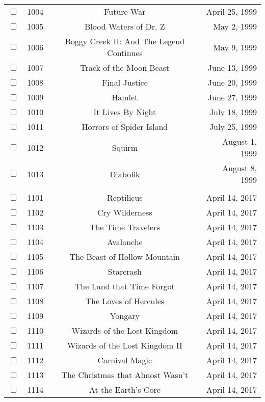 \documentclass[12pt]{article}
\begin{document}
\begin{center}
\begin{longtable}[c]{cccr}
$\Box$&1004&Future War&April 25, 1999\\
$\Box$&1005&Blood Waters of Dr. Z&May  2, 1999\\
$\Box$&1006&Boggy Creek II: And The Legend Continues&May  9, 1999\\
$\Box$&1007&Track of the Moon Beast&June 13, 1999\\
$\Box$&1008&Final Justice&June 20, 1999\\
$\Box$&1009&Hamlet&June 27, 1999\\
$\Box$&1010&It Lives By Night&July 18, 1999\\
$\Box$&1011&Horrors of Spider Island&July 25, 1999\\
$\Box$&1012&Squirm&August  1, 1999\\
$\Box$&1013&Diabolik&August  8, 1999\\
\\
$\Box$&1101&Reptilicus&April 14, 2017\\
$\Box$&1102&Cry Wilderness&April 14, 2017\\
$\Box$&1103&The Time Travelers&April 14, 2017\\
$\Box$&1104&Avalanche&April 14, 2017\\
$\Box$&1105&The Beast of Hollow Mountain&April 14, 2017\\
$\Box$&1106&Starcrash&April 14, 2017\\
$\Box$&1107&The Land that Time Forgot&April 14, 2017\\
$\Box$&1108&The Loves of Hercules&April 14, 2017\\
$\Box$&1109&Yongary&April 14, 2017\\
$\Box$&1110&Wizards of the Lost Kingdom&April 14, 2017\\
$\Box$&1111&Wizards of the Lost Kingdom II&April 14, 2017\\
$\Box$&1112&Carnival Magic&April 14, 2017\\
$\Box$&1113&The Christmas that Almost Wasn't&April 14, 2017\\
$\Box$&1114&At the Earth's Core&April 14, 2017\\

\end{longtable}
\end{center}
\end{document}
